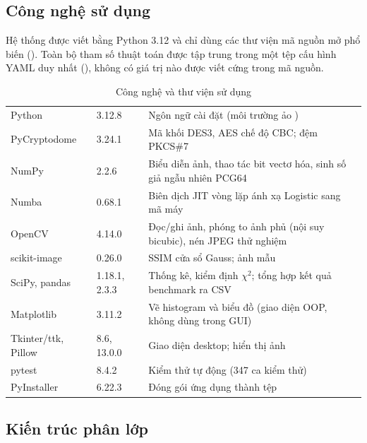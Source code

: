 \subsection{Công nghệ sử dụng}

Hệ thống được viết bằng Python 3.12 và chỉ dùng các thư viện mã nguồn mở phổ biến
(). Toàn bộ tham số thuật toán được tập trung trong một tệp cấu hình YAML duy nhất
(), không có giá trị nào được viết cứng trong mã nguồn.

\begin{table}[H]
\centering
\caption{Công nghệ và thư viện sử dụng}
\label{tab:tech}
\small
\begin{tabularx}{\linewidth}{@{}P{3.4cm}P{1.9cm}L@{}}
\toprule
{} &  & \\
\midrule
Python & 3.12.8 & Ngôn ngữ cài đặt (môi trường ảo )\\
PyCryptodome \cite{pycryptodome} & 3.24.1 & Mã khối DES3, AES chế độ CBC; đệm PKCS\#7\\
NumPy \cite{harris2020numpy} & 2.2.6 & Biểu diễn ảnh, thao tác bit vectơ hóa, sinh số giả ngẫu nhiên PCG64\\
Numba \cite{lam2015numba} & 0.68.1 & Biên dịch JIT vòng lặp ánh xạ Logistic sang mã máy\\
OpenCV \cite{bradski2000} & 4.14.0 & Đọc/ghi ảnh, phóng to ảnh phủ (nội suy bicubic), nén JPEG thử nghiệm\\
scikit-image \cite{vanderwalt2014} & 0.26.0 & SSIM cửa sổ Gauss; ảnh mẫu \\
SciPy, pandas & 1.18.1, 2.3.3 & Thống kê, kiểm định $\chi^2$; tổng hợp kết quả benchmark ra CSV\\
Matplotlib & 3.11.2 & Vẽ histogram và biểu đồ (giao diện OOP, không dùng  trong GUI)\\
Tkinter/ttk, Pillow & 8.6, 13.0.0 & Giao diện desktop; hiển thị ảnh\\
pytest & 8.4.2 & Kiểm thử tự động (347 ca kiểm thử)\\
PyInstaller & 6.22.3 & Đóng gói ứng dụng thành tệp \\
\bottomrule
\end{tabularx}
\end{table}

\subsection{Kiến trúc phân lớp}

